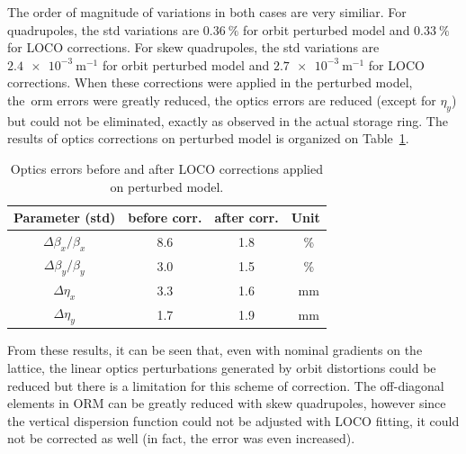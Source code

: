 The order of magnitude of variations in both cases are very similiar. For quadrupoles, the std variations are $\SI{0.36}{\%}$ for orbit perturbed model and $\SI{0.33}{\%}$ for LOCO corrections. For skew quadrupoles, the std variations are $\SI{2.4e-3}{\meter^{-1}}$ for orbit perturbed model and $\SI{2.7e-3}{\meter^{-1}}$ for LOCO corrections. When these corrections were applied in the perturbed model, the~\gls{orm} errors were greatly reduced, the optics errors are reduced (except for $\eta_y$) but could not be eliminated, exactly as observed in the actual storage ring. The results of optics corrections on perturbed model is organized on Table~\ref{tab:params_corr}.
\begin{table}
    \centering
    \caption{Optics errors before and after LOCO corrections applied on perturbed model.}
    \label{tab:params_corr}
    \begin{tabular}{cccc}
        \toprule\toprule
        Parameter (std) & before corr. & after corr. & Unit\\
        \hline
        $\Delta\beta_x/\beta_x$ & \SI{8.6}{} & \SI{1.8}{} & \SI{}{\%}\\
        $\Delta\beta_y/\beta_y$ & \SI{3.0}{} & \SI{1.5}{} & \SI{}{\%}\\
        $\Delta\eta_x$ & \SI{3.3}{} & \SI{1.6}{} & \SI{}{\milli\meter} \\
        $\Delta\eta_y$ & \SI{1.7}{} & \SI{1.9}{} & \SI{}{\milli\meter}\\    
        \bottomrule\bottomrule
    \end{tabular}
\end{table}


From these results, it can be seen that, even with nominal gradients on the lattice, the linear optics perturbations generated by orbit distortions could be reduced but there is a limitation for this scheme of correction. The off-diagonal elements in ORM can be greatly reduced with skew quadrupoles, however since the vertical dispersion function could not be adjusted with LOCO fitting, it could not be corrected as well (in fact, the error was even increased). 

